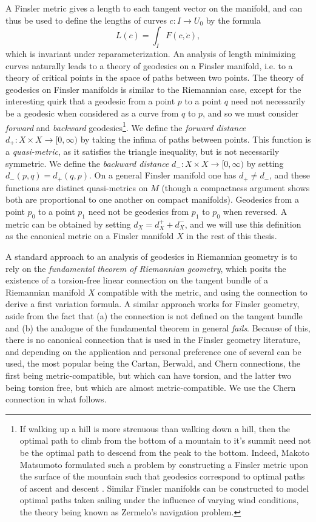 A Finsler metric gives a length to each tangent vector on the manifold, and can thus be used to define the lengths of curves $c: I \to U_0$ by the formula
%
\begin{equation}
  L(c) = \int_I F(c,\dot{c}),
\end{equation}
%
which is invariant under reparameterization. An analysis of length minimizing curves naturally leads to a theory of geodesics on a Finsler manifold, i.e. to a theory of critical points in the space of paths between two points. The theory of geodesics on Finsler manifolds is similar to the Riemannian case, except for the interesting quirk that a geodesic from a point $p$ to a point $q$ need not necessarily be a geodesic when considered as a curve from $q$ to $p$, and so we must consider \emph{forward} and \emph{backward} geodesics\footnote{If walking up a hill is more strenuous than walking down a hill, then the optimal path to climb from the bottom of a mountain to it's summit need not be the optimal path to descend from the peak to the bottom. Indeed, Makoto Matsumoto formulated such a problem by constructing a Finsler metric upon the surface of the mountain such that geodesics correspond to optimal paths of ascent and descent \cite{Matsumoto}. Similar Finsler manifolds can be constructed to model optimal paths taken sailing under the influence of varying wind conditions, the theory being known as Zermelo's navigation problem.}. We define the \emph{forward distance} $d_+: X \times X \to [0,\infty)$ by taking the infima of paths between points. This function is a \emph{quasi-metric}, as it satisfies the triangle inequality, but is not necessarily symmetric. We define the \emph{backward distance} $d_-: X \times X \to [0,\infty)$ by setting $d_-(p,q) = d_+(q,p)$. On a general Finsler manifold one has $d_+ \neq d_-$, and these functions are distinct quasi-metrics on $M$ (though a compactness argument shows both are proportional to one another on compact manifolds). Geodesics from a point $p_0$ to a point $p_1$ need not be geodesics from $p_1$ to $p_0$ when reversed. A metric can be obtained by setting $d_X = d_X^+ + d_X^-$, and we will use this definition as the canonical metric on a Finsler manifold $X$ in the rest of this thesis.

A standard approach to an analysis of geodesics in Riemannian geometry is to rely on the \emph{fundamental theorem of Riemannian geometry}, which posits the existence of a torsion-free linear connection on the tangent bundle of a Riemannian manifold $X$ compatible with the metric, and using the connection to derive a first variation formula. A similar approach works for Finsler geometry, aside from the fact that (a) the connection is not defined on the tangent bundle and (b) the analogue of the fundamental theorem in general \emph{fails}. Because of this, there is no canonical connection that is used in the Finsler geometry literature, and depending on the application and personal preference one of several can be used, the most popular being the Cartan, Berwald, and Chern connections, the first being metric-compatible, but which can have torsion, and the latter two being torsion free, but which are almost metric-compatible. We use the Chern connection in what follows.

